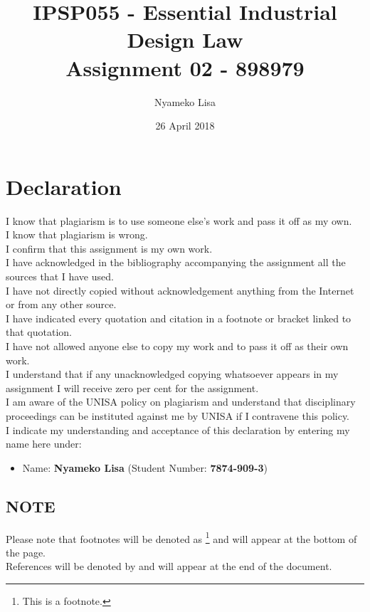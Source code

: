 \documentclass[11pt]{article}
\author{Nyameko Lisa}
\date{26 April 2018}
\title{IPSP055 - Essential Industrial Design Law\\\medskip
\large Assignment 02 - 898979}
\begin{document}
\maketitle
\addvspace{110pt}

\justifying
\addvspace{110pt}
\section*{Declaration}
\label{sec:org39968e6}
I know that plagiarism is to use someone else’s work and pass it off as my own.\\
I know that plagiarism is wrong.\\
I confirm that this assignment is my own work.\\
I have acknowledged in the bibliography accompanying the assignment all the sources that I have used.\\
I have not directly copied without acknowledgement anything from the Internet or from any other source.\\
I have indicated every quotation and citation in a footnote or bracket linked to that quotation.\\
I have not allowed anyone else to copy my work and to pass it off as their own work.\\
I understand that if any unacknowledged copying whatsoever appears in my assignment I will receive zero per cent for the assignment.\\
I am aware of the UNISA policy on plagiarism and understand that disciplinary proceedings can be instituted against me by UNISA if I contravene this policy.\\
I indicate my understanding and acceptance of this declaration by
entering my name here under:
\begin{itemize}
\item Name: \textbf{Nyameko Lisa} (Student Number: \textbf{7874-909-3})
\end{itemize}

\subsection*{NOTE}
\label{sec:org5838cac}
Please note that footnotes will be denoted as \footnote{This is a footnote.} and will
appear at the bottom of the page.\\
References will be denoted by \cite{rsa93_designs_act} and will appear at the end of the document.
\newpage
\end{document}
